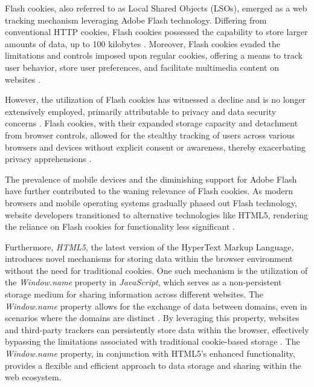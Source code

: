 Flash cookies, also referred to as Local Shared Objects (LSOs), emerged as a web tracking mechanism leveraging Adobe Flash technology.
Differing from conventional HTTP cookies, Flash cookies possessed the capability to store larger amounts of data, up to 100 kilobytes \cite{sipior2011online}.
Moreover, Flash cookies evaded the limitations and controls imposed upon regular cookies, offering a means to track user behavior,
store user preferences, and facilitate multimedia content on websites \cite{krishnamurthy2011privacy}.

However, the utilization of Flash cookies has witnessed a decline and is no longer extensively employed, primarily attributable
to privacy and data security concerns \cite{hoofnagle2010different}. Flash cookies, with their expanded storage capacity and detachment from browser controls,
allowed for the stealthy tracking of users across various browsers and devices without explicit consent or awareness,
thereby exacerbating privacy apprehensions \cite{soltani2010flash}.

The prevalence of mobile devices and the diminishing support for Adobe Flash have further contributed to the waning relevance of Flash
cookies. As modern browsers and mobile operating systems gradually phased out Flash technology, website developers transitioned to
alternative technologies like HTML5, rendering the reliance on Flash cookies for functionality less significant \cite{bbcflash}.

Furthermore, \emph{HTML5}, the latest version of the HyperText Markup Language, introduces novel mechanisms for storing data within the browser 
environment without the need for traditional cookies. One such mechanism
is the utilization of the \emph{Window.name} property in \emph{JavaScript}, which serves as a non-persistent storage medium for sharing
information across different websites. The \emph{Window.name} property allows for the exchange of data between domains,
even in scenarios where the domains are distinct \cite{sy2018tracking}. By leveraging this property, websites and third-party trackers
can persistently store data within the browser, effectively bypassing the limitations associated with traditional
cookie-based storage \cite{pan2015not}. The \emph{Window.name} property, in conjunction with HTML5's enhanced functionality, provides a
flexible and efficient approach to data storage and sharing within the web ecosystem.

